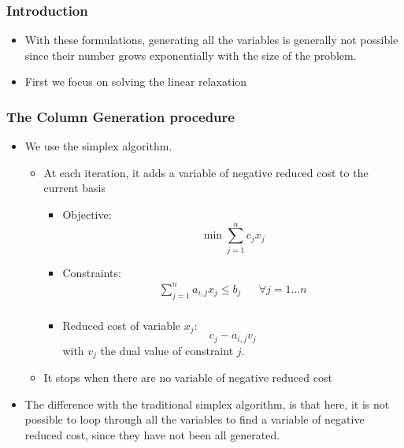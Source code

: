 \documentclass[10pt]{beamer}
\begin{document}
\begin{frame}
  \frametitle{Introduction}
  
  \begin{itemize}
    \item With these formulations, generating all the variables is generally not possible since their number grows exponentially with the size of the problem.
    \item First we focus on solving the \alert{linear relaxation}
  \end{itemize}
\end{frame}

\begin{frame}
  \frametitle{The Column Generation procedure}
  
  \begin{itemize}
    \item We use the \alert{simplex algorithm}.
      \begin{itemize}
        \item At each iteration, it adds a variable of negative reduced cost to the current basis
        \begin{itemize}
          \item Objective:
            \begin{displaymath}
              \min \sum_{j = 1}^n c_j x_j
            \end{displaymath}
          \item Constraints:
          \begin{align*}
            \sum_{j = 1}^n a_{i, j} x_j \le b_j && \forall j = 1 \dots n \\
          \end{align*}
          \item Reduced cost of variable $x_j$:
            \begin{displaymath}
              c_j - a_{i, j} v_j
            \end{displaymath}
            with $v_j$ the dual value of constraint $j$.
        \end{itemize}
        \item It stops when there are no variable of negative reduced cost
      \end{itemize}
    \item The difference with the traditional simplex algorithm, is that here, it is not possible to loop through all the variables to find a variable of negative reduced cost, since they have not been all generated.
  \end{itemize}
\end{frame}
\end{document}
